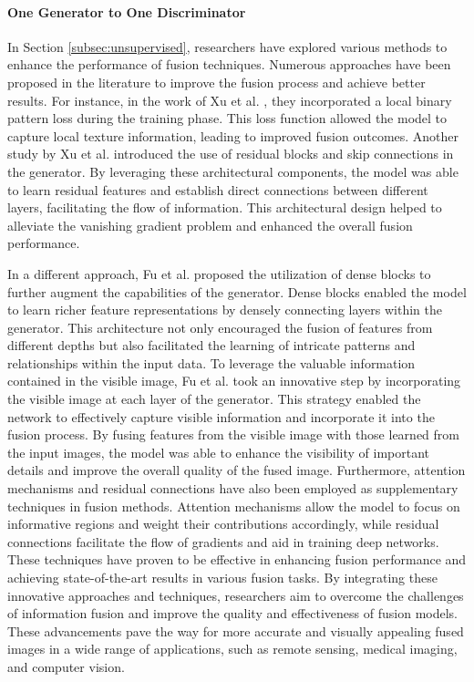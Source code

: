 \paragraph{One Generator to One Discriminator}

In Section \ref{subsec:unsupervised}, researchers have explored various methods to enhance the performance of fusion techniques. Numerous approaches have been proposed in the literature to improve the fusion process and achieve better results. For instance, in the work of Xu et al. \cite{xu2020lbp}, they incorporated a local binary pattern loss during the training phase. This loss function allowed the model to capture local texture information, leading to improved fusion outcomes. Another study by Xu et al. \cite{xu2020infrared} introduced the use of residual blocks and skip connections in the generator. By leveraging these architectural components, the model was able to learn residual features and establish direct connections between different layers, facilitating the flow of information. This architectural design helped to alleviate the vanishing gradient problem and enhanced the overall fusion performance.

In a different approach, Fu et al. \cite{fu2021image} proposed the utilization of dense blocks to further augment the capabilities of the generator. Dense blocks enabled the model to learn richer feature representations by densely connecting layers within the generator. This architecture not only encouraged the fusion of features from different depths but also facilitated the learning of intricate patterns and relationships within the input data. To leverage the valuable information contained in the visible image, Fu et al. \cite{fu2021image} took an innovative step by incorporating the visible image at each layer of the generator. This strategy enabled the network to effectively capture visible information and incorporate it into the fusion process. By fusing features from the visible image with those learned from the input images, the model was able to enhance the visibility of important details and improve the overall quality of the fused image. Furthermore, attention mechanisms \cite{wang2021new} and residual connections \cite{xu2020infrared} have also been employed as supplementary techniques in fusion methods. Attention mechanisms allow the model to focus on informative regions and weight their contributions accordingly, while residual connections facilitate the flow of gradients and aid in training deep networks. These techniques have proven to be effective in enhancing fusion performance and achieving state-of-the-art results in various fusion tasks. By integrating these innovative approaches and techniques, researchers aim to overcome the challenges of information fusion and improve the quality and effectiveness of fusion models. These advancements pave the way for more accurate and visually appealing fused images in a wide range of applications, such as remote sensing, medical imaging, and computer vision.